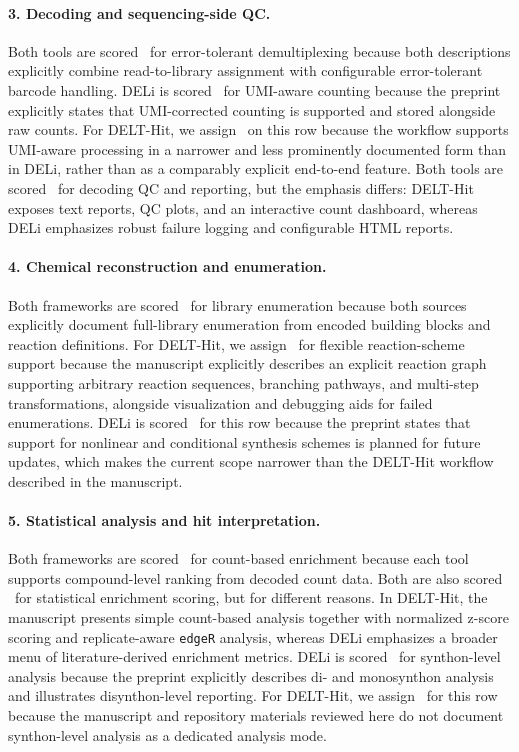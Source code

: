 \paragraph{3. Decoding and sequencing-side QC.}
Both tools are scored \statusgreen\ for error-tolerant demultiplexing because both descriptions explicitly combine read-to-library assignment with configurable error-tolerant barcode handling. DELi is scored \statusgreen\ for UMI-aware counting because the preprint explicitly states that UMI-corrected counting is supported and stored alongside raw counts. For DELT-Hit, we assign \statusamber\ on this row because the workflow supports UMI-aware processing in a narrower and less prominently documented form than in DELi, rather than as a comparably explicit end-to-end feature. Both tools are scored \statusgreen\ for decoding QC and reporting, but the emphasis differs: DELT-Hit exposes text reports, QC plots, and an interactive count dashboard, whereas DELi emphasizes robust failure logging and configurable HTML reports.

\paragraph{4. Chemical reconstruction and enumeration.}
Both frameworks are scored \statusgreen\ for library enumeration because both sources explicitly document full-library enumeration from encoded building blocks and reaction definitions. For DELT-Hit, we assign \statusgreen\ for flexible reaction-scheme support because the manuscript explicitly describes an explicit reaction graph supporting arbitrary reaction sequences, branching pathways, and multi-step transformations, alongside visualization and debugging aids for failed enumerations. DELi is scored \statusred\ for this row because the preprint states that support for nonlinear and conditional synthesis schemes is planned for future updates, which makes the current scope narrower than the DELT-Hit workflow described in the manuscript.

\paragraph{5. Statistical analysis and hit interpretation.}
Both frameworks are scored \statusgreen\ for count-based enrichment because each tool supports compound-level ranking from decoded count data. Both are also scored \statusgreen\ for statistical enrichment scoring, but for different reasons. In DELT-Hit, the manuscript presents simple count-based analysis together with normalized z-score scoring and replicate-aware \texttt{edgeR} analysis, whereas DELi emphasizes a broader menu of literature-derived enrichment metrics. DELi is scored \statusgreen\ for synthon-level analysis because the preprint explicitly describes di- and monosynthon analysis and illustrates disynthon-level reporting. For DELT-Hit, we assign \statusred\ for this row because the manuscript and repository materials reviewed here do not document synthon-level analysis as a dedicated analysis mode.

